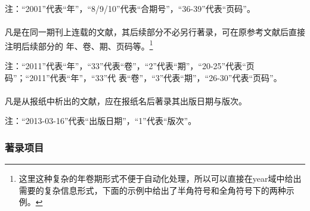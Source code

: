 \documentclass[twoside]{article}%
\begin{document}
\mbox{}{\small 注：“2001”代表“年”，“8/9/10”代表“合期号”，“36-39”代表“页码”。\par}



\paragraph{}\label{sec:normal:pages} 凡是在同一期刊上连载的文献，其后续部分不必另行著录，可在原参考文献后直接注明后续部分的
年、卷、期、页码等。\footnote{这里这种复杂的年卷期形式不便于自动化处理，所以可以直接在year域中给出需要的复杂信息形式，下面的示例中给出了半角符号和全角符号下的两种示例。}

\begin{refsection}

\nocite{egdatevolnumpagef--,egdatevolnumpagefull--}

{}

\end{refsection}

\mbox{}{\small
注：“2011”代表“年”，“33”代表“卷”，“2”代表“期”，“20-25”代表“页码”；“2011”代表“年”，“33”代
表“卷”，“3”代表“期”，“26-30”代表“页码”。\par}



\paragraph{} 凡是从报纸中析出的文献，应在报纸名后著录其出版日期与版次。


\begin{refsection}

\nocite{egdatevolnumpagei--}

{}
\end{refsection}

\mbox{}{\small 注：“2013-03-16”代表“出版日期”，“1”代表“版次”。\par}


\subsubsection{著录项目}
\end{document}
